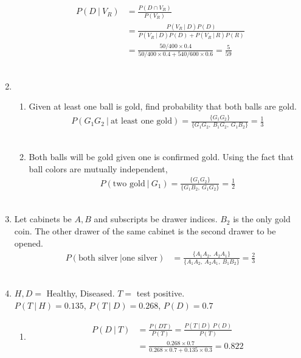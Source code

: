 \begin{enumerate}
		\begin{align}
			P(D \ |\ V_R) &= \frac{P(D \cap V_R)}{P(V_R)} \\
			&= \frac{P(V_R \ |\ D) P(D)}{P(V_R \ |\ D) P(D) + P(V_R \ |\ R) P(R)} \\
			&= \frac{50/400 \times 0.4}{50/400 \times 0.4 + 540/600 \times 0.6} = \frac{5}{59}
		\end{align}\\
	
	
	\item \begin{enumerate}
		\item Given at least one ball is gold, find probability that both balls are gold. \\
		\begin{align}
			P(G_1 G_2 \ |\ \text{at least one gold}) = \frac{\{ G_1 G_2 \}}{\{ G_1 G_2,\ B_1 G_2,\ G_1 B_2 \}} = \frac{1}{3}
		\end{align} \\
		
		\item Both balls will be gold given one is confirmed gold. Using the fact that ball colors are mutually independent,\\
		\begin{align}
			P(\text{two gold}\ |\ G_1) = \frac{\{ G_1 G_2 \}}{\{ G_1 B_2 ,\ G_1 G_2\}} = \frac{1}{2}
		\end{align} \\
	\end{enumerate}
	
	\item Let cabinets be $ A, B $ and subscripts be drawer indices. $ B_2 $ is the only gold coin. The other drawer of the same cabinet is the second drawer to be opened. \\
	\begin{align}
		P(\text{both silver}\ | \text{one silver}) &= \frac{\{ A_1 A_2,\ A_2 A_1 \}}{\{ A_1 A_2,\ A_2 A_1,\ B_1 B_2 \}} = \frac{2}{3}
	\end{align}\\
	
	\item $ H, D = $ Healthy, Diseased. $ T =  $ test positive. \\
	$ P(T\ |\ H) = 0.135 $, $ P(T\ |\ D) = 0.268 $, $ P(D) = 0.7 $\\
	
	\begin{enumerate}
		\item \begin{align}
			P(D\ |\ T) &= \frac{P(DT)}{P(T)} = \frac{P(T\ |\ D) \ P(D)}{P(T)} \\
			&= \frac{0.268 \times 0.7}{0.268 \times 0.7 + 0.135 \times 0.3} = 0.822
		\end{align}\\
		

\end{enumerate}
\end{enumerate}
